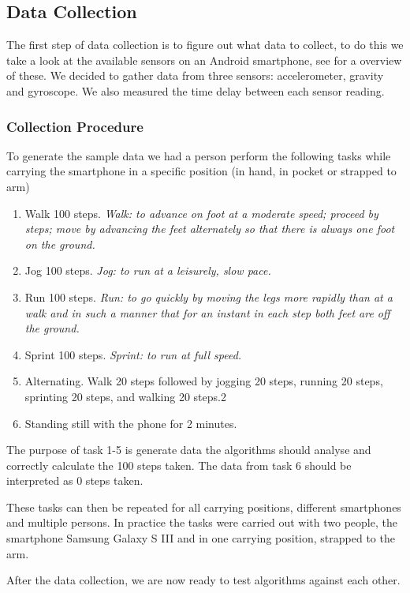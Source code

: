 \subsection{Data Collection}
The first step of data collection is to figure out what data to collect, to do this we take a look at the available sensors on an Android smartphone, see \citet{android:sensor} for a overview of these. We decided to gather data from three sensors: accelerometer, gravity and gyroscope. We also measured the time delay between each sensor reading.

\subsubsection{Collection Procedure}
To generate the sample data we had a person perform the following tasks while carrying the smartphone in a specific position (in hand, in pocket or strapped to arm)
\begin{enumerate}
\item Walk 100 steps. \textit{Walk: to advance on foot at a moderate speed; proceed by steps; move by advancing the feet alternately so that there is always one foot on the ground.} %
\item Jog 100 steps. \textit{Jog: to run at a leisurely, slow pace.} %
\item Run 100 steps. \textit{Run: to go quickly by moving the legs more rapidly than at a walk and in such a manner that for an instant in each step both feet are off the ground.} %
\item Sprint 100 steps. \textit{Sprint: to run at full speed.} %
\item Alternating. Walk 20 steps followed by jogging 20 steps, running 20 steps, sprinting 20 steps, and walking 20 steps.2
\item Standing still with the phone for 2 minutes.
\end{enumerate}

The purpose of task 1-5 is generate data the algorithms should analyse and correctly calculate the 100 steps taken. The data from task 6 should be interpreted as 0 steps taken.

These tasks can then be repeated for all carrying positions, different smartphones and multiple persons. In practice the tasks were carried out with two people, the smartphone Samsung Galaxy S III and in one carrying position, strapped to the arm.

After the data collection, we are now ready to test algorithms against each other.
